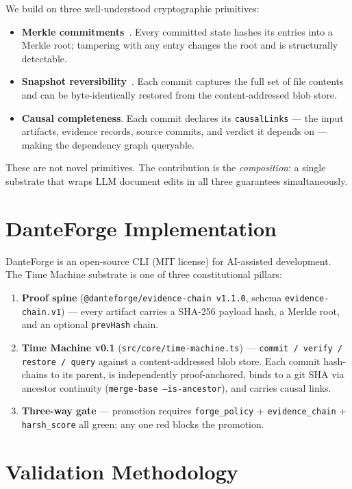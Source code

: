 \documentclass[11pt]{article}
\begin{document}
We build on three well-understood cryptographic primitives:

\begin{itemize}
\item \textbf{Merkle commitments}~\cite{nakamoto2008bitcoin}. Every committed state hashes its entries into a Merkle root; tampering with any entry changes the root and is structurally detectable.
\item \textbf{Snapshot reversibility}~\cite{loeliger2012git}. Each commit captures the full set of file contents and can be byte-identically restored from the content-addressed blob store.
\item \textbf{Causal completeness}. Each commit declares its \texttt{causalLinks} --- the input artifacts, evidence records, source commits, and verdict it depends on --- making the dependency graph queryable.
\end{itemize}

These are not novel primitives. The contribution is the \emph{composition}: a single substrate that wraps LLM document edits in all three guarantees simultaneously.

\section{DanteForge Implementation}

DanteForge is an open-source CLI (MIT license) for AI-assisted development. The Time Machine substrate is one of three constitutional pillars:

\begin{enumerate}
\item \textbf{Proof spine} (\texttt{@danteforge/evidence-chain v1.1.0}, schema \texttt{evidence-chain.v1}) --- every artifact carries a SHA-256 payload hash, a Merkle root, and an optional \texttt{prevHash} chain.
\item \textbf{Time Machine v0.1} (\texttt{src/core/time-machine.ts}) --- \texttt{commit / verify / restore / query} against a content-addressed blob store. Each commit hash-chains to its parent, is independently proof-anchored, binds to a git SHA via ancestor continuity (\texttt{merge-base --is-ancestor}), and carries causal links.
\item \textbf{Three-way gate} --- promotion requires \texttt{forge\_policy} + \texttt{evidence\_chain} + \texttt{harsh\_score} all green; any one red blocks the promotion.
\end{enumerate}

\section{Validation Methodology}
\end{document}
